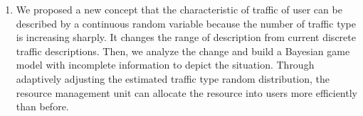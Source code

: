 {\begin{enumerate}[(1.)]
    \item We proposed a new concept that the characteristic of traffic of user can be described by a continuous random variable because the number of traffic type is increasing sharply. It changes the range of description from current discrete traffic descriptions. Then, we analyze the change and  build a Bayesian game model with incomplete information to depict the situation.
Through adaptively adjusting the estimated traffic type random distribution, the resource management unit can allocate the resource into users more efficiently than before.
\end{enumerate}

}

